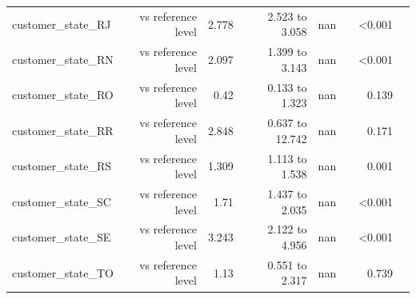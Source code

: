 \begin{table}[htbp]
\begin{tabular}{lrrrrrrr}
customer\_state\_RJ & vs reference level & 2.778 & 2.523 to 3.058 & nan &  & <0.001 &  \\
customer\_state\_RN & vs reference level & 2.097 & 1.399 to 3.143 & nan &  & <0.001 &  \\
customer\_state\_RO & vs reference level & 0.42 & 0.133 to 1.323 & nan &  & 0.139 &  \\
customer\_state\_RR & vs reference level & 2.848 & 0.637 to 12.742 & nan &  & 0.171 &  \\
customer\_state\_RS & vs reference level & 1.309 & 1.113 to 1.538 & nan &  & 0.001 &  \\
customer\_state\_SC & vs reference level & 1.71 & 1.437 to 2.035 & nan &  & <0.001 &  \\
customer\_state\_SE & vs reference level & 3.243 & 2.122 to 4.956 & nan &  & <0.001 &  \\
customer\_state\_TO & vs reference level & 1.13 & 0.551 to 2.317 & nan &  & 0.739 &  \\
\bottomrule
\end{tabular}
\par\smallskip\begin{minipage}{\linewidth}\footnotesize \end{minipage}
\end{table}


